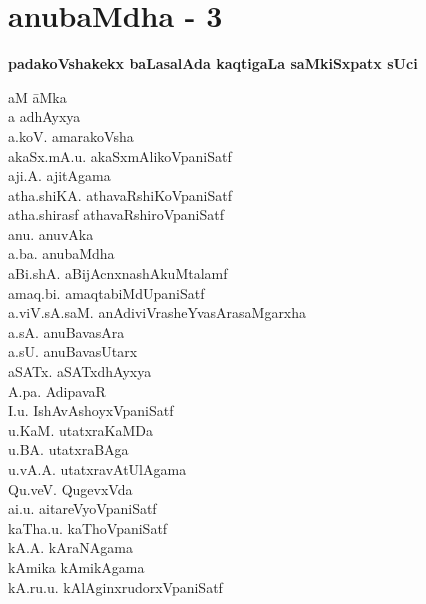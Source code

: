 \chapter*{anubaMdha - 3}

\lhead[]{}
\rhead[]{}

\begin{center}
{\Large\bf padakoVshakekx baLasalAda kaqtigaLa saMkiSxpatx sUci}
\end{center}

\medskip

{
\setlength{\columnseprule}{1pt} 
\begin{multicols}{2}
\begin{tabbing}
aM\hspace{3cm} \= aMka\\[2pt]
a \> adhAyxya\\[2pt]
a.koV. \> amarakoVsha\\[2pt]
akaSx.mA.u. \> akaSxmAlikoVpaniSatf\\[2pt]
aji.A. \> ajitAgama\\[2pt]
atha.shiKA. \> athavaRshiKoVpaniSatf\\[2pt]
atha.shirasf \> athavaRshiroVpaniSatf\\[2pt]
anu. \> anuvAka\\[2pt]
a.ba. \> anubaMdha\\[2pt]
aBi.shA. \> aBijAcnxnashAkuMtalamf\\[2pt]
amaq.bi. \> amaqtabiMdUpaniSatf\\[2pt]
a.viV.sA.saM. \> anAdiviVrasheYvasArasaMgarxha\\[2pt]
a.sA. \> anuBavasAra\\[2pt]
a.sU. \> anuBavasUtarx\\[2pt]
aSATx. \> aSATxdhAyxya\\[2pt]
A.pa. \> AdipavaR\\[2pt]
I.u. \> IshAvAshoyxVpaniSatf\\[2pt]
u.KaM. \> utatxraKaMDa\\[2pt]
u.BA. \> utatxraBAga\\[2pt]
u.vA.A. \> utatxravAtUlAgama\\[2pt]
Qu.veV. \> QugevxVda\\[2pt]
ai.u. \> aitareVyoVpaniSatf\\[2pt]
kaTha.u. \> kaThoVpaniSatf\\[2pt]
kA.A. \> kAraNAgama\\[2pt]
kAmika \> kAmikAgama\\[2pt]
kA.ru.u. \> kAlAginxrudorxVpaniSatf\\[2pt]

\end{tabbing}
\end{multicols}}
